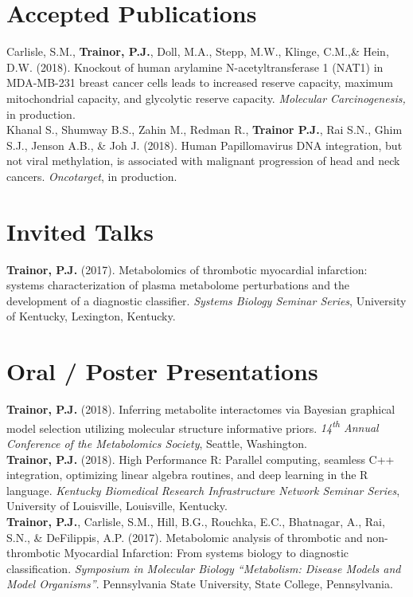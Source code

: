 {\section*{Accepted Publications}
Carlisle, S.M., \textbf{Trainor, P.J.}, Doll, M.A., Stepp, M.W., Klinge, C.M.,\& Hein, D.W. (2018). Knockout of human arylamine N-acetyltransferase 1 (NAT1) in MDA-MB-231 breast
cancer cells leads to increased reserve capacity, maximum mitochondrial capacity, and glycolytic reserve capacity. \emph{Molecular Carcinogenesis,} in production. \\ 

Khanal S., Shumway B.S., Zahin M., Redman R., \textbf{Trainor P.J.}, Rai S.N., Ghim S.J., Jenson A.B., \& Joh J. (2018). Human Papillomavirus DNA integration, but not viral methylation, is associated with malignant progression of head and neck cancers. \emph{Oncotarget}, in production.

\section*{Invited Talks}
\textbf{Trainor, P.J.} (2017). Metabolomics of thrombotic myocardial infarction: systems characterization of plasma metabolome perturbations and the development of a diagnostic classifier. \emph{Systems Biology Seminar Series}, University of Kentucky, Lexington, Kentucky.

\section*{Oral / Poster Presentations}
\textbf{Trainor, P.J.} (2018). Inferring metabolite interactomes via Bayesian graphical model selection utilizing molecular structure informative priors. \emph{14\textsuperscript{th} Annual Conference of the Metabolomics Society}, Seattle, Washington.  \\ 

\textbf{Trainor, P.J.} (2018). High Performance R: Parallel computing, seamless C++ integration, optimizing linear algebra routines, and deep learning in the R language. \emph{Kentucky Biomedical Research Infrastructure Network Seminar Series}, University of Louisville, Louisville, Kentucky.  \\ 

\textbf{Trainor, P.J.}, Carlisle, S.M., Hill, B.G., Rouchka, E.C., Bhatnagar, A., Rai, S.N., \& DeFilippis, A.P. (2017). Metabolomic analysis of thrombotic and non-thrombotic Myocardial Infarction: From systems biology to diagnostic classification. \emph{Symposium in Molecular Biology ``Metabolism: Disease Models and Model Organisms''}. Pennsylvania State University, State College, Pennsylvania.  \\ 

}
